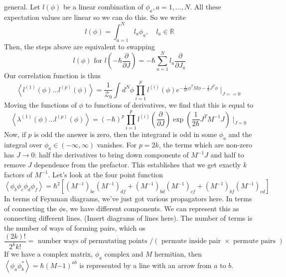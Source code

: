 \documentclass[11pt, oneside]{article}   	%
\theoremstyle{slanted}
\begin{document}
general. 
Let $ l ( \phi ) $ be a linear combination 
of $ \phi _ a , a = 1, \dots, N $. 
All these expectation values are linear so we can do 
this. 
So we write 
\[
l \left(  \phi   \right)   = \int_{ a = 1 } ^ N l _ a \phi _ a , \quad 
l _ a \in \mathbb{ R } 
\]  Then, the steps above 
are equivalent 
to swapping 
\[
l \left( \phi  \right)  \text{ for } l \left( 
 - \hbar \frac{\partial  }{\partial  J } \right)  
  = - \hbar \sum_{ a = 1 }^ N l _ a \frac{\partial }{\partial J_ a } 
\] Our correlation function 
is thus 
\[
\left< l ^{ \left( 1  \right)  } \left( \phi  \right)  \dots 
l ^{ \left( p \right) } \left( \phi  \right)  \right>
 = \frac{1}{\mathcal{ Z } _ 0 } \int d ^ N \phi 
 \prod_{ i =  1} ^ p l ^{ \left( i  \right)  } \left( \phi  \right) 
 e ^{  - \frac{1}{ 2 \hbar } \phi ^ T M \phi  - \frac{1}{\hbar } J ^ T \phi } \mid_{ J =  = 0 }
\] Moving the functions of $ \phi $ to functions 
of derivatives, 
we find that this is equal to 
\[
\left< \lambda ^{ \left( 1  \right)  } \left( \phi  \right)  
\dots l ^{\left( p  \right)  }\left( \phi  \right)  \right>  
 = \left(  - \hbar  \right)  ^ p 
 \prod _{ i = 1 } ^ p l ^{ \left( i  \right)  } 
 \left( \frac{\partial  }{\partial  J }   \right)  \exp \left( 
 \frac{1}{  2 \hbar} J ^{ T } M ^{ - 1 } J \right) \mid_{ J = 0 } 
\]  
Now, if $ p$  is odd the answer is zero, 
then the integrand is odd in some $ \phi _a $ 
and the integral over $ \phi _ a \in \left(  - \infty , \infty  \right)  $ 
vanishes. 
For $ p = 2k $, the terms which are 
non-zero has $ J \to 0 $: half the derivatives to bring down 
components of $ M ^{ - 1} J $ and half to remove 
$ J $ dependence from the prefactor. 
This establishes that we get exactly $ k $ factors of $ M ^{ - 1 } $. 
Let's look at the four point function 
\[
\left< \phi _ b \phi _ c \phi _ d \phi _ f  \right>  = 
\hbar ^ 2 \left[  \left( M ^{  - 1}  \right) _{ b c } \left( M ^{ - 1 }  \right)  
_{ 
df } + \left( M ^{ - 1 } \right) _{ bd } \left( M ^{ - 1}  \right) _{ cf } 
+ \left( M ^{ - 1}  \right) _{ bf } \left( M ^{ - 1 }  \right)_{ cd }\right] 
\] In terms 
of Feynman diagrams, we've just got various propagators 
here. In terms of connecting the $ \phi $s, 
we have different components. 
We can represent this as connecting different lines. 
(Insert diagrams of lines here). 
The number of terms is the number of 
ways of forming pairs, which os 
\[
\frac{\left(  2k  \right)  ! }{ 2 ^ k k ! }  = \text{ number ways of permutating points }
/ ( \text{ permute inside pair }  \times \text{ permute pairs } ) 
\]  If we have a complex matrix, 
$ \phi _ a $ complex and $ M $ hermitian, 
then $ \left< \phi _ a \phi _ b ^ *  \right>  =  \hbar ( M { - 1 }) ^{ ab } $ 
is represented by a line with an arrow from $ a $ to $ b $. 
\end{document}
